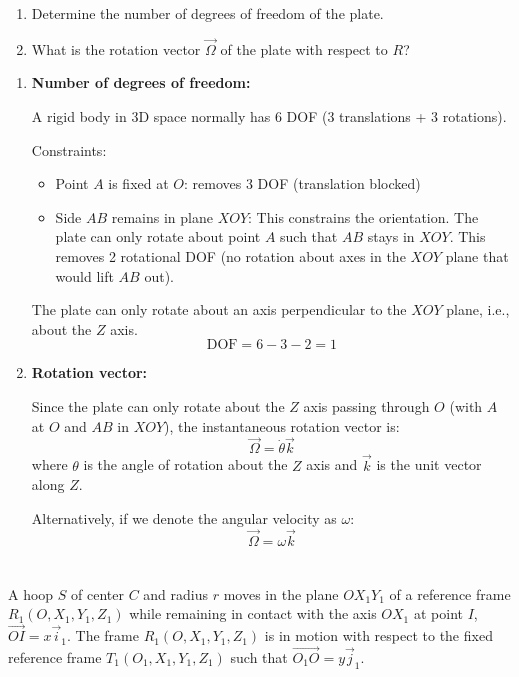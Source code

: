 \documentclass[12pt]{article}
\begin{document}
\begin{enumerate}
    \item Determine the number of degrees of freedom of the plate.
    \item What is the rotation vector $\vec{\Omega}$ of the plate with respect to $R$?
\end{enumerate}

\begin{correctionbox}
\begin{enumerate}
    \item \textbf{Number of degrees of freedom:}
    
    A rigid body in 3D space normally has 6 DOF (3 translations + 3 rotations).
    
    Constraints:
    \begin{itemize}
        \item Point $A$ is fixed at $O$: removes 3 DOF (translation blocked)
        \item Side $AB$ remains in plane $XOY$: This constrains the orientation. The plate can only rotate about point $A$ such that $AB$ stays in $XOY$. This removes 2 rotational DOF (no rotation about axes in the $XOY$ plane that would lift $AB$ out).
    \end{itemize}
    
    The plate can only rotate about an axis perpendicular to the $XOY$ plane, i.e., about the $Z$ axis.
    $$\text{DOF} = 6 - 3 - 2 = 1$$
    
    \item \textbf{Rotation vector:}
    
    Since the plate can only rotate about the $Z$ axis passing through $O$ (with $A$ at $O$ and $AB$ in $XOY$), the instantaneous rotation vector is:
    $$\vec{\Omega} = \dot{\theta} \vec{k}$$
    where $\theta$ is the angle of rotation about the $Z$ axis and $\vec{k}$ is the unit vector along $Z$.
    
    Alternatively, if we denote the angular velocity as $\omega$:
    $$\vec{\Omega} = \omega \vec{k}$$
\end{enumerate}
\end{correctionbox}

\newpage
\section{}

A hoop $S$ of center $C$ and radius $r$ moves in the plane $OX_1Y_1$ of a reference frame $R_1(O, X_1, Y_1, Z_1)$ while remaining in contact with the axis $OX_1$ at point $I$, $\overrightarrow{OI} = x\vec{i}_1$. The frame $R_1(O, X_1, Y_1, Z_1)$ is in motion with respect to the fixed reference frame $T_1(O_1, X_1, Y_1, Z_1)$ such that $\overrightarrow{O_1O} = y\vec{j}_1$.
\end{document}

